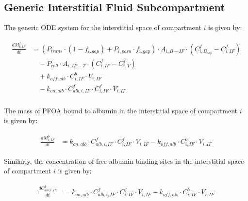 \documentclass[preprint,12pt,authoryear]{elsarticle}
\begin{document}
\subsection{Generic Interstitial Fluid Subcompartment}

The generic ODE system for the interstitial space of compartment $i$ is given by:

\begin{align}
\begin{aligned}
\frac{dM_{i,IF}^f}{dt} &= (P_{trans}\cdot  (1-f_{i,gap}) + P_{i,para} \cdot f_{i,gap}) \cdot A_{i,B-IF} \cdot (C_{i,B_{cap}}^f - C_{i,IF}^f) \\ 
& \quad - P_{cell} \cdot A_{i,IF-T} \cdot (C_{i,IF}^f - C_{i,T}^f) \\
& \quad + k_{off,alb} \cdot C_{i,IF}^b \cdot V_{i,IF} \\
& \quad - k_{on,alb} \cdot C_{alb,i,IF}^f \cdot C_{i,IF}^f \cdot V_{i,IF} \\
\end{aligned}
\label{eq:PFOA_interstitial_ODE_free}
\end{align}

The mass of PFOA bound to albumin in the interstitial space of compartment $i$ is given by:

\begin{align}
\begin{aligned}
\frac{dM_{i,IF}^b}{dt} &= k_{on,alb} \cdot C_{alb,i,IF}^f \cdot C_{i,IF}^f \cdot V_{i,IF}
- k_{off,alb} \cdot C_{i,IF}^b \cdot V_{i,IF}
\end{aligned}
\label{eq:PFOA_interstitial_ODE_bound}
\end{align}

Similarly, the concentration of free albumin binding sites in the interstitial space of compartment $i$ is given by:

\begin{align}
\begin{aligned}
\frac{dC_{alb,i,IF}^f}{dt} &= k_{on,alb} \cdot C_{alb,i,IF}^f \cdot C_{i,IF}^f \cdot V_{i,IF}
- k_{off,alb} \cdot C_{i,IF}^b \cdot V_{i,IF}
\end{aligned}
\label{eq:PFOA_interstitial_ODE_albumin}
\end{align}
\end{document}
